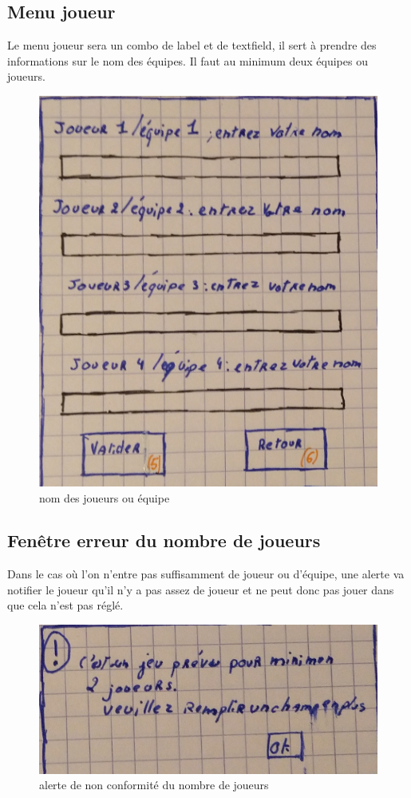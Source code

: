 \subsection{Menu joueur}
Le menu joueur sera un combo de label et de textfield, il sert à prendre des informations sur le nom des équipes. Il faut au minimum deux équipes ou joueurs.
\begin{figure}[ht]
	\centering
	\includegraphics[scale=0.5]{menu_joueur.png}
	\caption{nom des joueurs ou équipe}
	\label{interface création d'équipe}
\end{figure} 

\newpage
\subsection{Fenêtre erreur du nombre de joueurs}
Dans le cas où l'on n'entre pas suffisamment de joueur ou d'équipe, une alerte va notifier le joueur qu'il n'y a pas assez de joueur et ne peut donc pas jouer dans que cela n'est pas réglé.
\begin{figure}[ht]
	\centering
	\includegraphics[scale=0.5]{fenetre_erreur_nb_joueur.png}
	\caption{alerte de non conformité du nombre de joueurs}
	\label{alerte du nombre de joueurs}
\end{figure}

